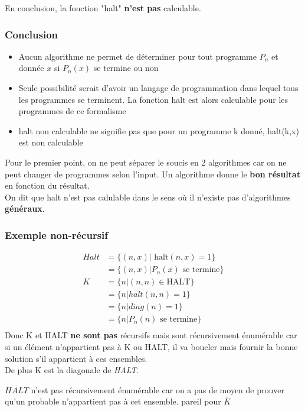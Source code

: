 \documentclass{report}
\begin{document}
En conclusion, la fonction "halt" \textbf{n'est pas} calculable.

\subsubsection{Conclusion}
\begin{itemize}
\item  Aucun algorithme ne permet de déterminer pour tout programme $P_n$ et donnée $x$ si $P_n(x)$ se termine ou non
\item Seule possibilité serait d’avoir un langage de programmation dans lequel tous les programmes se terminent. La fonction halt est alors calculable pour les programmes de ce formalisme
\item halt non calculable ne signifie pas que pour un programme k donné, halt(k,x) est
non calculable
\end{itemize}
Pour le premier point, on ne peut séparer le soucis en 2 algorithmes car on ne peut changer de programmes selon l'input. Un algorithme donne le \textbf{bon résultat} en fonction du résultat.\\

On dit que halt n'est pas calulable dans le sens où il n'existe pas d'algorithmes \textbf{généraux}.

\subsubsection{Exemple non-récursif}

\begin{align*}
Halt &= \{(n,x) | \text{ halt}(n,x) = 1\}\\
&= \{(n,x) | P_n (x) \text{ se termine}\}\\
K &= \{n | (n,n) \in \text{HALT}\}\\
&= \{n | halt(n,n) = 1\}\\
&= \{n | diag(n) = 1\}\\
&= \{n | P_n(n) \text{ se termine}\}\\
\end{align*}
Donc K et HALT \textbf{ne sont pas} récursifs mais sont récursivement énumérable car si un élément n'appartient pas à K ou HALT, il va boucler mais fournir la bonne solution s'il appartient à ces ensembles.\\
De plus K est la diagonale de \textit{HALT}.

$\overline{HALT}$ n'est pas récursivement énumérable car on a pas de moyen de prouver qu'un probable n'appartient pas à cet ensemble. pareil pour $\overline{K}$
\end{document}
